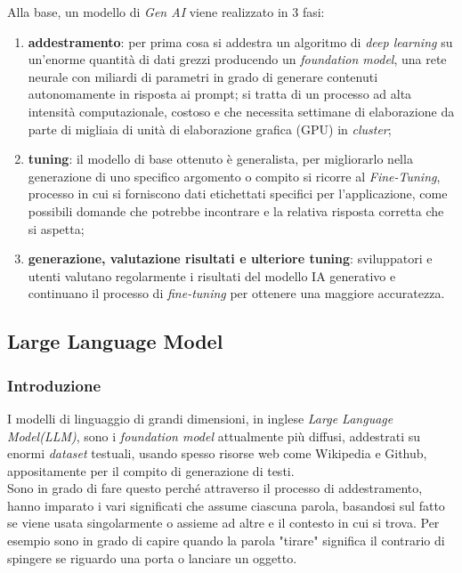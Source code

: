Alla base, un modello di \textit{Gen AI} viene realizzato in 3 fasi: 
\begin{enumerate}
    \item \textbf{addestramento}: per prima cosa si addestra un algoritmo di \textit{deep learning} su un'enorme quantità di dati grezzi producendo un \textit{foundation model}, una rete neurale con miliardi di parametri in grado di generare contenuti autonomamente in risposta ai prompt; si tratta di un processo ad alta intensità computazionale, costoso e che necessita  settimane di elaborazione da parte di migliaia di unità di elaborazione grafica (GPU) in \textit{cluster};
    \item \textbf{tuning}: il modello di base ottenuto è generalista, per migliorarlo nella generazione di uno specifico argomento o compito si ricorre al \textit{Fine-Tuning}, processo in cui si forniscono dati etichettati specifici per l'applicazione, come possibili domande che potrebbe incontrare e la relativa risposta corretta che si aspetta;
    \item \textbf{generazione, valutazione risultati e ulteriore tuning}: sviluppatori e utenti valutano regolarmente i risultati del modello IA generativo e continuano il processo di \textit{fine-tuning} per ottenere una maggiore accuratezza.
\end{enumerate} 


\newpage
\subsection{Large Language Model}
\subsubsection{Introduzione}
I modelli di linguaggio di grandi dimensioni, in inglese \textit{Large Language Model(LLM)}, sono i \textit{foundation model} attualmente più diffusi, addestrati su enormi \textit{dataset} testuali, usando spesso risorse web come Wikipedia e Github, appositamente per il compito di generazione di testi. \\

Sono in grado di fare questo perché attraverso il processo di addestramento, hanno imparato i vari significati che assume ciascuna parola, basandosi sul fatto se viene usata singolarmente o assieme ad altre e il contesto in cui si trova. Per esempio sono in grado di capire quando la parola "tirare" significa il contrario di spingere se riguardo una porta o lanciare un oggetto. \\

